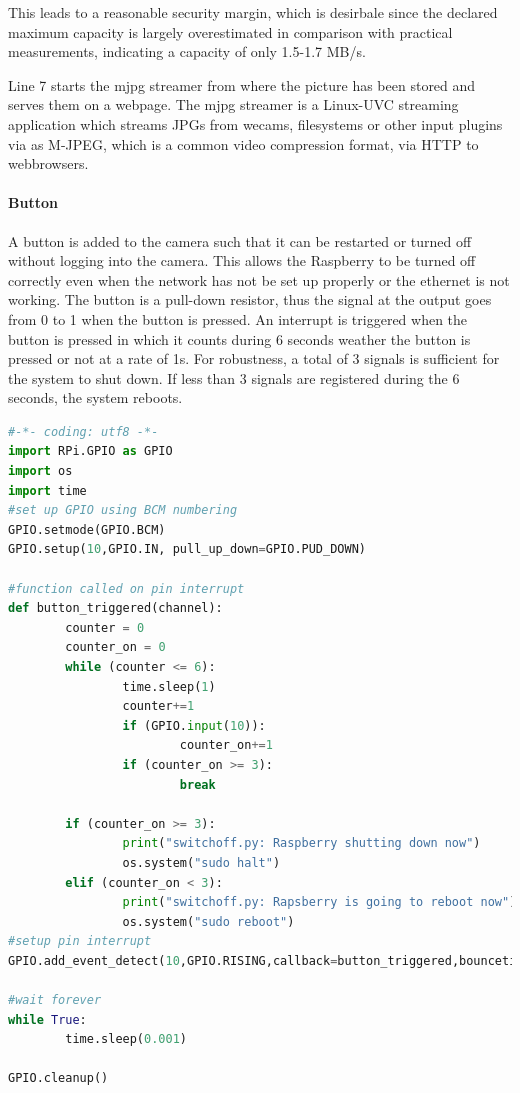 This leads to a reasonable security margin, which is desirbale since the declared maximum capacity is largely overestimated in comparison with practical measurements, indicating a capacity of only 1.5-1.7 MB/s.

Line 7 starts the mjpg streamer from where the picture has been stored and serves them on a webpage. The mjpg streamer is a Linux-UVC streaming application which streams JPGs from wecams, filesystems or other input plugins via as M-JPEG, which is a common video compression format, via HTTP to webbrowsers.

\paragraph{Button}

A button is added to the camera such that it can be restarted or turned off without logging into the camera. This allows the Raspberry to be turned off correctly even when the network has not be set up properly or the ethernet is not working.
The button is a pull-down resistor, thus the signal at the output goes from 0 to 1 when the button is pressed. An interrupt is triggered when the button is pressed in which it counts during 6 seconds weather the button is pressed or not at a rate of 1s. For robustness, a total of 3 signals is sufficient for the system to shut down. If less than 3 signals are registered during the 6 seconds, the system reboots. 

\begin{center}
\begin{minipage}{0.9\linewidth}
\begin{lstlisting}[caption=$\sim\hspace{-0.5em}/switchoff.sh$, label=switchoff, language=Python, frame=none]
#-*- coding: utf8 -*-
import RPi.GPIO as GPIO
import os
import time
#set up GPIO using BCM numbering
GPIO.setmode(GPIO.BCM)
GPIO.setup(10,GPIO.IN, pull_up_down=GPIO.PUD_DOWN)

#function called on pin interrupt
def button_triggered(channel):
        counter = 0
        counter_on = 0
        while (counter <= 6):
                time.sleep(1)
                counter+=1
                if (GPIO.input(10)):
                        counter_on+=1
                if (counter_on >= 3):
                        break

        if (counter_on >= 3):
                print("switchoff.py: Raspberry shutting down now")
                os.system("sudo halt")
        elif (counter_on < 3):
                print("switchoff.py: Rapsberry is going to reboot now")
                os.system("sudo reboot")
#setup pin interrupt
GPIO.add_event_detect(10,GPIO.RISING,callback=button_triggered,bouncetime=300)

#wait forever
while True:
        time.sleep(0.001)

GPIO.cleanup()
\end{lstlisting}
\end{minipage}
\end{center}


